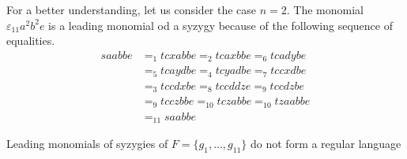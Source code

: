 \documentclass[sigconf]{acmart}
\theoremstyle{plain}
\theoremstyle{definition}
\theoremstyle{remark}
\begin{document}
For a better understanding, let us consider the case $n=2$. The monomial $\varepsilon_{11}a^2b^2e$ is a leading monomial od a syzygy because of the following sequence of equalities.
\begin{align*}
saabbe & =_{1} tcxabbe =_{2} tcaxbbe =_{6} tcadybe \\
& =_{5} tcaydbe =_{4} tcyadbe =_{7} tccxdbe \\
& =_{3} tccdxbe =_{8} tccddze =_{9} tccdzbe \\
& =_{9} tcczbbe =_{10} tczabbe =_{10} tzaabbe \\
& =_{11} saabbe
\end{align*}


\begin{proposition}
  Leading monomials of syzygies of $F=\{g_1,\dots,g_{11}\}$ do not form a regular language
\end{proposition}
\end{document}

